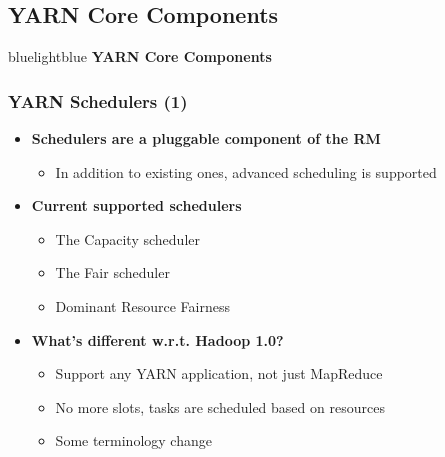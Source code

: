 \subsection{YARN Core Components}
\begin{frame}
 \begin{colorblock}{blue}{lightblue}{ }
    \Large \textbf{YARN Core Components}
  \end{colorblock}
\end{frame}

\begin{frame}
\frametitle{YARN Schedulers (1)}
\begin{itemize}
  \item {\bf Schedulers are a pluggable component of the RM}
  \begin{itemize}
    \item In addition to existing ones, advanced scheduling is supported
  \end{itemize}

\vspace{20pt}

  \item {\bf Current supported schedulers}
  \begin{itemize}
    \item The Capacity scheduler
    \item The Fair scheduler
    \item Dominant Resource Fairness
  \end{itemize}

\vspace{20pt}

  \item {\bf What's different w.r.t. Hadoop 1.0?}
  \begin{itemize}
    \item Support any YARN application, not just MapReduce
    \item No more slots, tasks are scheduled based on resources
    \item Some terminology change
  \end{itemize}
\end{itemize}
\end{frame}

